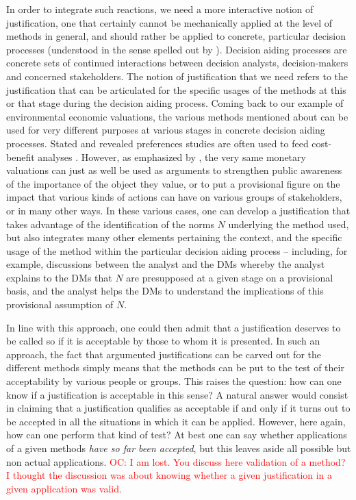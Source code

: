 \documentclass[preprint, french, english, 11pt, authoryear]{elsarticle}%
\newcommand{\commentOC}[1]{\textcolor{red}{OC: #1}}
\begin{document}
In order to integrate such reactions, we need a more interactive notion of justification, one that certainly cannot be mechanically applied at the level of methods in general, and should rather be applied to concrete, particular decision processes (understood in the sense spelled out by \citet{tsoukias_concept_2007}). Decision aiding processes are concrete sets of continued interactions between decision analysts, decision-makers and concerned stakeholders. The notion of justification that we need refers to the justification that can be articulated for the specific usages of the methods at this or that stage during the decision aiding process. Coming back to our example of environmental economic valuations, the various methods mentioned about can be used for very different purposes at various stages in concrete decision aiding processes. Stated and revealed preferences studies are often used to feed cost-benefit analyses \citep{layard_cost-benefit_1994}. However, as emphasized by \citet{meinard_ethical_2016}, the very same monetary valuations can just as well be used as arguments to strengthen public awareness of the importance of the object they value, or to put a provisional figure on the impact that various kinds of actions can have on various groups of stakeholders, or in many other ways. In these various cases, one can develop a justification that takes advantage of the identification of the norms $N$ underlying the method used, but also integrates many other elements pertaining the context, and the specific usage of the method within the particular decision aiding process -- including, for example, discussions between the analyst and the \acp{DM} whereby the analyst explains to the \acp{DM} that $N$ are presupposed at a given stage on a provisional basis, and the analyst helps the \acp{DM} to understand the implications of this provisional assumption of $N$.

In line with this approach, one could then admit that a justification deserves to be called so if it is acceptable by those to whom it is presented. In such an approach, the fact that argumented justifications can be carved out for the different methods simply means that the methods can be put to the test of their acceptability by various people or groups. This raises the question: how can one know if a justification is acceptable in this sense? A natural answer would consist in claiming that a justification qualifies as acceptable if and only if it turns out to be accepted in all the situations in which it can be applied. However, here again, how can one perform that kind of test? At best one can say whether applications of a given methods \emph{have so far been accepted}, but this leaves aside all possible but non actual applications.
\commentOC{I am lost. You discuss here validation of a method? I thought the discussion was about knowing whether a given justification in a given application was valid.}
\end{document}
